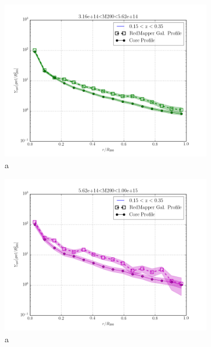 \documentclass[twocolumn]{article}
\begin{document}
\begin{figure}
\begin{subfigure}{.5\textwidth}
    \centering\includegraphics[width=1.0\linewidth]{figs/cfn/basic_rm.param/plot_zmrs.py/fig4.png}
    \caption{a}
  \end{subfigure}%
  \begin{subfigure}{.5\textwidth}
    \centering\includegraphics[width=1.0\linewidth]{figs/cfn/basic_rm.param/plot_zmrs.py/fig5.png}
    \caption{a}
  \end{subfigure}
  \begin{subfigure}{.5\textwidth}

\end{subfigure}
\end{figure}
\end{document}
